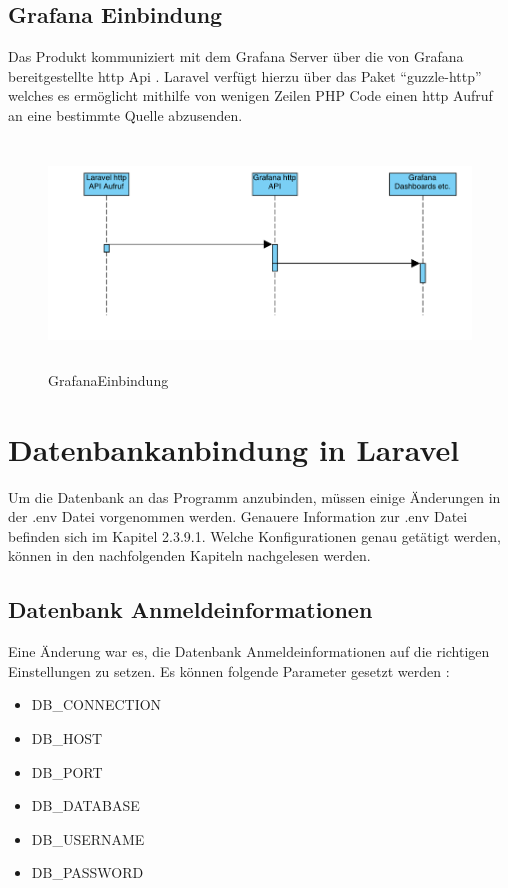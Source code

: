 \subsection{Grafana Einbindung}
Das Produkt kommuniziert mit dem Grafana Server über die von Grafana bereitgestellte http Api . Laravel verfügt hierzu über das Paket “guzzle-http” welches es ermöglicht mithilfe von wenigen Zeilen PHP Code einen http Aufruf an eine bestimmte Quelle abzusenden.
\begin{figure}[h]
	\centering
	\includegraphics[height=6cm,width=18cm]{images/GrafanaEinbindung}
	\caption{GrafanaEinbindung}
	\label{fig:GrafanaEinbindung}
\end{figure}





\section{Datenbankanbindung in Laravel}
Um die Datenbank an das Programm anzubinden, müssen einige Änderungen in der .env Datei vorgenommen werden. Genauere Information zur .env Datei befinden sich im Kapitel  2.3.9.1. Welche Konfigurationen genau getätigt werden, können in den nachfolgenden Kapiteln nachgelesen werden. 

\subsection{Datenbank Anmeldeinformationen}
Eine Änderung war es, die Datenbank Anmeldeinformationen auf die richtigen Einstellungen zu setzen. Es können folgende Parameter gesetzt werden : 
\begin{itemize}
	\item DB\_CONNECTION
	\item DB\_HOST
	\item DB\_PORT
	\item DB\_DATABASE
	\item DB\_USERNAME
	\item DB\_PASSWORD
\end{itemize}

